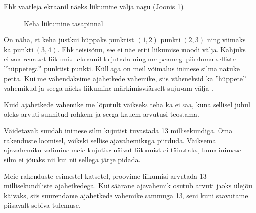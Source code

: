 \begin{flushleft}
Ehk vaatleja ekraanil näeks liikumine välja nagu (Joonis \ref{Joonis 3}).
\vspace{2mm}

\begin{figure}[h]
\centering
{}
\caption{Keha liikumine tasapinnal}
\label{Joonis 3}
\end{figure}

\vspace{2mm}
On näha, et keha justkui hüppaks punktist $(1,2)$ punkti $(2,3)$ ning viimaks ka punkti $(3,4)$. Ehk teisisõnu, see ei näe eriti liikumise moodi välja. Kahjuks ei saa reaalset liikumist ekraanil kujutada ning me peamegi piirduma selliste ''hüppetega'' punktist punkti. Küll aga on meil võimalus inimese silma natuke petta. Kui me vähendaksime ajahetkede vahemike, siis väheneksid ka ''hüppete'' vahemikud ja seega näeks liikumine märkimisväärselt sujuvam välja \cite{fpsyoutube}.

\vspace{2mm}
Kuid ajahetkede vahemike me lõputult väikseks teha ka ei saa, kuna sellisel juhul oleks arvuti sunnitud rohkem ja seega kauem arvutusi teostama.

\vspace{2mm}
Väidetavalt \cite{potter2014detecting} suudab inimese silm kujutist tuvastada 13 millisekundiga. Oma rakenduste loomisel, võikski sellise ajavahemikuga piirduda. Väiksema ajavahemiku valimine meie kujutise näivat liikumist ei täiustaks, kuna inimese silm ei jõuaks nii kui nii sellega järge pidada.

\vspace{2mm}
Meie rakenduste esimestel katsetel, proovime liikumisi arvutada 13 millisekundiliste ajahetkedega. Kui säärane ajavahemik osutub arvuti jaoks ülejõu käivaks, siis suurendame ajahetkede vahemike sammuga 13, seni kuni saavutame piisavalt sobiva tulemuse.


\end{flushleft}